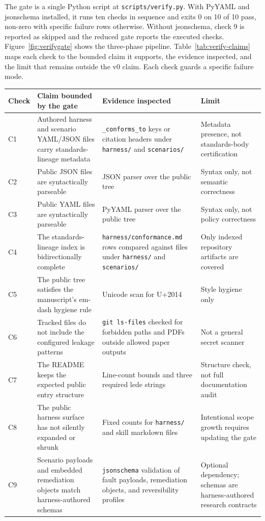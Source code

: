 \documentclass[twocolumn,10pt,a4paper]{article}
\begin{document}
The gate is a single Python script at \texttt{scripts/verify.py}. With PyYAML and jsonschema installed, it runs ten checks in sequence and exits 0 on 10 of 10 pass, non-zero with specific failure rows otherwise. Without jsonschema, check 9 is reported as skipped and the reduced gate reports the executed checks. Figure~\ref{fig:verifygate} shows the three-phase pipeline. Table~\ref{tab:verify-claims} maps each check to the bounded claim it supports, the evidence inspected, and the limit that remains outside the v0 claim. Each check guards a specific failure mode.

\begin{table}[t]
\centering
\small
\begin{tabularx}{\textwidth}{p{1.2cm}X X X}
\toprule
Check & Claim bounded by the gate & Evidence inspected & Limit \\
\midrule
C1 & Authored harness and scenario YAML/JSON files carry standards-lineage metadata & \texttt{\_conforms\_to} keys or citation headers under \texttt{harness/} and \texttt{scenarios/} & Metadata presence, not standards-body certification \\
C2 & Public JSON files are syntactically parseable & JSON parser over the public tree & Syntax only, not semantic correctness \\
C3 & Public YAML files are syntactically parseable & PyYAML parser over the public tree & Syntax only, not policy correctness \\
C4 & The standards-lineage index is bidirectionally complete & \texttt{harness/conformance.md} rows compared against files under \texttt{harness/} and \texttt{scenarios/} & Only indexed repository artifacts are covered \\
C5 & The public tree satisfies the manuscript's em-dash hygiene rule & Unicode scan for U+2014 & Style hygiene only \\
C6 & Tracked files do not include the configured leakage patterns & \texttt{git ls-files} checked for forbidden paths and PDFs outside allowed paper outputs & Not a general secret scanner \\
C7 & The README keeps the expected public entry structure & Line-count bounds and three required lede strings & Structure check, not full documentation audit \\
C8 & The public harness surface has not silently expanded or shrunk & Fixed counts for \texttt{harness/} and skill markdown files & Intentional scope growth requires updating the gate \\
C9 & Scenario payloads and embedded remediation objects match harness-authored schemas & \texttt{jsonschema} validation of fault payloads, remediation objects, and reversibility profiles & Optional dependency; schemas are harness-authored research contracts \\

\end{tabularx}
\end{table}
\end{document}
